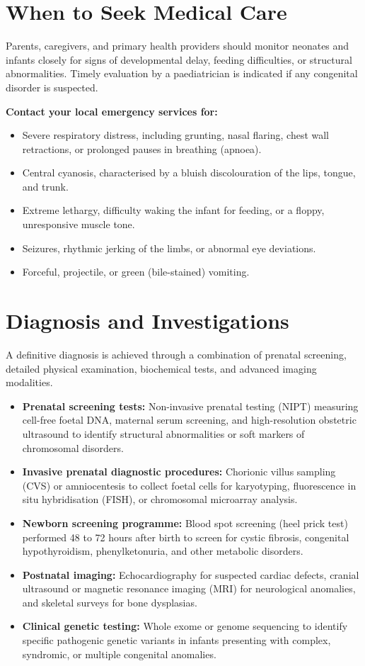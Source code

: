 \section*{When to Seek Medical Care}
Parents, caregivers, and primary health providers should monitor neonates and infants closely for signs of developmental delay, feeding difficulties, or structural abnormalities. Timely evaluation by a paediatrician is indicated if any congenital disorder is suspected.

\textbf{Contact your local emergency services for:}
\begin{itemize}
    \item Severe respiratory distress, including grunting, nasal flaring, chest wall retractions, or prolonged pauses in breathing (apnoea).
    \item Central cyanosis, characterised by a bluish discolouration of the lips, tongue, and trunk.
    \item Extreme lethargy, difficulty waking the infant for feeding, or a floppy, unresponsive muscle tone.
    \item Seizures, rhythmic jerking of the limbs, or abnormal eye deviations.
    \item Forceful, projectile, or green (bile-stained) vomiting.
\end{itemize}

\section*{Diagnosis and Investigations}
A definitive diagnosis is achieved through a combination of prenatal screening, detailed physical examination, biochemical tests, and advanced imaging modalities.

\begin{itemize}
    \item \textbf{Prenatal screening tests:} Non-invasive prenatal testing (NIPT) measuring cell-free foetal DNA, maternal serum screening, and high-resolution obstetric ultrasound to identify structural abnormalities or soft markers of chromosomal disorders.
    \item \textbf{Invasive prenatal diagnostic procedures:} Chorionic villus sampling (CVS) or amniocentesis to collect foetal cells for karyotyping, fluorescence in situ hybridisation (FISH), or chromosomal microarray analysis.
    \item \textbf{Newborn screening programme:} Blood spot screening (heel prick test) performed 48 to 72 hours after birth to screen for cystic fibrosis, congenital hypothyroidism, phenylketonuria, and other metabolic disorders.
    \item \textbf{Postnatal imaging:} Echocardiography for suspected cardiac defects, cranial ultrasound or magnetic resonance imaging (MRI) for neurological anomalies, and skeletal surveys for bone dysplasias.
    \item \textbf{Clinical genetic testing:} Whole exome or genome sequencing to identify specific pathogenic genetic variants in infants presenting with complex, syndromic, or multiple congenital anomalies.
\end{itemize}

